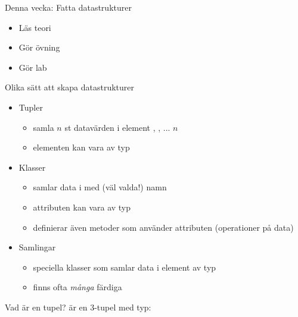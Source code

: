 
\begin{Slide}{Denna vecka: Fatta datastrukturer}
\begin{itemize}
\item Läs teori
\item Gör övning 
\item Gör lab 
\end{itemize}
\end{Slide}


\begin{Slide}{Olika sätt att skapa datastrukturer}
\begin{itemize}
\item Tupler
  \begin{itemize}
  \item samla $n$ st datavärden i element , , ...  \code{_}$n$
  \item elementen kan vara av  typ
  \end{itemize}
\item Klasser   
  \begin{itemize}
  \item samlar data i  med (väl valda!) namn
  \item attributen kan vara av  typ
  \item definierar även metoder som använder attributen (operationer på data)
  \end{itemize}

\item Samlingar 
  \begin{itemize}
  \item speciella klasser som samlar data i element av  typ
  \item finns ofta \emph{många} färdiga  
  \end{itemize}
\end{itemize}
\end{Slide}

\begin{Slide}{Vad är en tupel?}
 är en 3-tupel med typ: 
\end{Slide}




